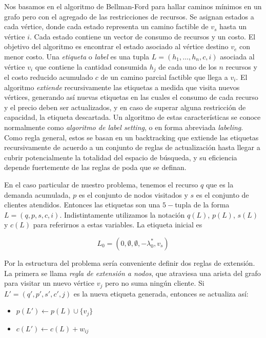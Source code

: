 Nos basamos en el algoritmo de Bellman-Ford para hallar caminos mínimos en un grafo pero con el agregado de las restricciones de recursos. Se asignan estados a cada vértice, donde cada estado representa un camino factible de $v_s$ hasta un vértice $i$. Cada estado contiene un vector de consumo de recursos y un costo. El objetivo del algoritmo es encontrar el estado asociado al vértice destino $v_e$ con menor costo.      
Una \emph{etiqueta} o \emph{label} es una tupla $L = (h_1, \dots, h_n, c, i)$ asociada al vértice $v_i$ que contiene la cantidad consumida $h_j$ de cada uno de los $n$ recursos y el costo reducido acumulado $c$ de un camino parcial factible que llega a $v_i$. El algoritmo \emph{extiende} recursivamente las etiquetas a medida que visita nuevos vértices, generando así nuevas etiquetas en las cuales el consumo de cada recurso y el precio deben ser actualizados, y en caso de superar alguna restricción de capacidad, la etiqueta descartada. Un algoritmo de estas características se conoce normalmente como \emph{algoritmo de label setting}, o en forma abreviada \emph{labeling}. Como regla general, estos se basan en un backtracking que extiende las etiquetas recursivamente de acuerdo a un conjunto de reglas de actualización hasta llegar a cubrir potencialmente la totalidad del espacio de búsqueda, y su eficiencia depende fuertemente de las reglas de poda que se definan.

En el caso particular de nuestro problema, tenemos el recurso $q$ que es la demanda acumulada, $p$ es el conjunto de nodos visitados y $s$ es el conjunto de clientes atendidos. Entonces las etiquetas son una $5-$tupla de la forma $L = (q, p, s, c, i)$. Indistintamente utilizamos la notación $q(L)$, $p(L)$, $s(L)$ y $c(L)$ para referirnos a estas variables. La etiqueta inicial es 

\begin{equation}
    L_0 = (0, \emptyset, \emptyset, -\lambda^{*}_0, v_s)
\end{equation}

Por la estructura del problema sería conveniente definir dos reglas de extensión. La primera se llama \emph{regla de extensión a nodos}, que atraviesa una arista del grafo para visitar un nuevo vértice $v_j$ pero no suma ningún cliente. Si $L' = (q', p', s', c', j)$ es la nueva etiqueta generada, entonces se actualiza así:

\begin{itemize}
    \item $p(L') \gets p(L) \cup \{v_j\}$
    \item $c(L') \gets c(L) + w_{ij}$
\end{itemize}

